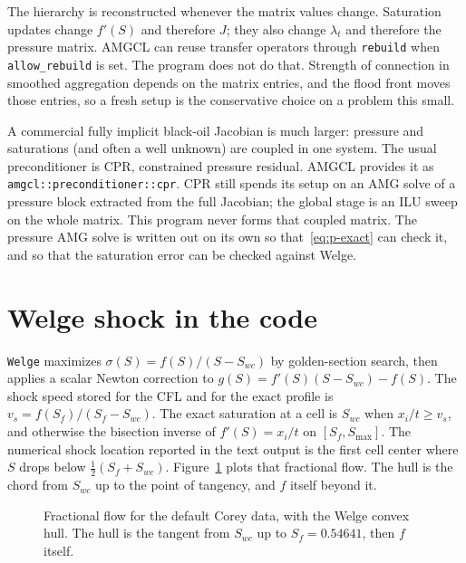 \documentclass[11pt]{article}
\begin{document}
The hierarchy is reconstructed whenever the matrix values change.
Saturation updates change $f'(S)$ and therefore $J$; they also change $\lambda_t$ and therefore the pressure matrix.
AMGCL can reuse transfer operators through \texttt{rebuild} when \texttt{allow\_rebuild} is set.
The program does not do that.
Strength of connection in smoothed aggregation depends on the matrix entries, and the flood front moves those entries, so a fresh setup is the conservative choice on a problem this small.

A commercial fully implicit black-oil Jacobian is much larger: pressure and saturations (and often a well unknown) are coupled in one system.
The usual preconditioner is CPR, constrained pressure residual.
AMGCL provides it as \texttt{amgcl::preconditioner::cpr}.
CPR still spends its setup on an AMG solve of a pressure block extracted from the full Jacobian; the global stage is an ILU sweep on the whole matrix.
This program never forms that coupled matrix.
The pressure AMG solve is written out on its own so that~\eqref{eq:p-exact} can check it, and so that the saturation error can be checked against Welge.

\section{Welge shock in the code}

\texttt{Welge} maximizes $\sigma(S) = f(S)/(S-S_{wc})$ by golden-section search, then applies a scalar Newton correction to $g(S) = f'(S)(S-S_{wc}) - f(S)$.
The shock speed stored for the CFL and for the exact profile is $v_s = f(S_f)/(S_f-S_{wc})$.
The exact saturation at a cell is $S_{wc}$ when $x_i/t \ge v_s$, and otherwise the bisection inverse of $f'(S) = x_i/t$ on $[S_f, S_{\max}]$.
The numerical shock location reported in the text output is the first cell center where $S$ drops below $\tfrac12(S_f + S_{wc})$.
Figure~\ref{fig:fflow} plots that fractional flow.
The hull is the chord from $S_{wc}$ up to the point of tangency, and $f$ itself beyond it.

\begin{figure}[ht]
\centering
{}
\caption{Fractional flow for the default Corey data, with the Welge convex hull.
The hull is the tangent from $S_{wc}$ up to $S_f = 0.54641$, then $f$ itself.}
\label{fig:fflow}
\end{figure}
\end{document}
